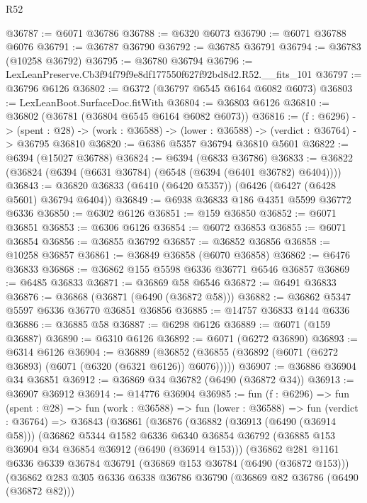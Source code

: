 \begin{lexlean}{R52}
\begin{coremodule}
@36787 := @6071 @36786
@36788 := @6320 @6073
@36790 := @6071 @36788 @6076
@36791 := @36787 @36790
@36792 := @36785 @36791
@36794 := @36783 (@10258 @36792)
@36795 := @36780 @36794
@36796 := LexLeanPreserve.Cb3f94f79f9e8df177550f627f92bd8d2.R52.__fits_101
@36797 := @36796 @6126
@36802 := @6372 (@36797 @6545 @6164 @6082 @6073)
@36803 := LexLeanBoot.SurfaceDoc.fitWith
@36804 := @36803 @6126
@36810 := @36802 (@36781 (@36804 @6545 @6164 @6082 @6073))
@36816 := (f : @6296) ->
  (spent : @28) -> (work : @36588) -> (lower : @36588) -> (verdict : @36764) -> @36795 @36810
@36820 := @6386 @5357 @36794 @36810 @5601
@36822 := @6394 (@15027 @36788)
@36824 := @6394 (@6833 @36786)
@36833 := @36822 (@36824 (@6394 (@6631 @36784) (@6548 (@6394 (@6401 @36782) @6404))))
@36843 := @36820 @36833 (@6410 (@6420 @5357)) (@6426 (@6427 (@6428 @5601) @36794 @6404))
@36849 := @6938 @36833 @186 @4351 @5599 @36772 @6336
@36850 := @6302 @6126
@36851 := @159 @36850
@36852 := @6071 @36851
@36853 := @6306 @6126
@36854 := @6072 @36853
@36855 := @6071 @36854
@36856 := @36855 @36792
@36857 := @36852 @36856
@36858 := @10258 @36857
@36861 := @36849 @36858 (@6070 @36858)
@36862 := @6476 @36833
@36868 := @36862 @155 @5598 @6336 @36771 @6546 @36857
@36869 := @6485 @36833
@36871 := @36869 @58 @6546
@36872 := @6491 @36833
@36876 := @36868 (@36871 (@6490 (@36872 @58)))
@36882 := @36862 @5347 @5597 @6336 @36770 @36851 @36856
@36885 := @14757 @36833 @144 @6336
@36886 := @36885 @58
@36887 := @6298 @6126
@36889 := @6071 (@159 @36887)
@36890 := @6310 @6126
@36892 := @6071 (@6272 @36890)
@36893 := @6314 @6126
@36904 := @36889
    (@36852 (@36855 (@36892 (@6071 (@6272 @36893) (@6071 (@6320 (@6321 @6126)) @6076)))))
@36907 := @36886 @36904 @34 @36851
@36912 := @36869 @34 @36782 (@6490 (@36872 @34))
@36913 := @36907 @36912
@36914 := @14776 @36904
@36985 := fun (f : @6296) =>
  fun (spent : @28) =>
  fun (work : @36588) =>
  fun (lower : @36588) =>
  fun (verdict : @36764) =>
  @36843
    (@36861
      (@36876
        (@36882
          (@36913 (@6490 (@36914 @58)))
          (@36862
            @5344
            @1582
            @6336
            @6340
            @36854
            @36792
            (@36885 @153 @36904 @34 @36854 @36912 (@6490 (@36914 @153)))
            (@36862
              @281
              @1161
              @6336
              @6339
              @36784
              @36791
              (@36869 @153 @36784 (@6490 (@36872 @153)))
              (@36862
                @283
                @305
                @6336
                @6338
                @36786
                @36790
                (@36869 @82 @36786 (@6490 (@36872 @82)))

\end{coremodule}
\end{lexlean}
